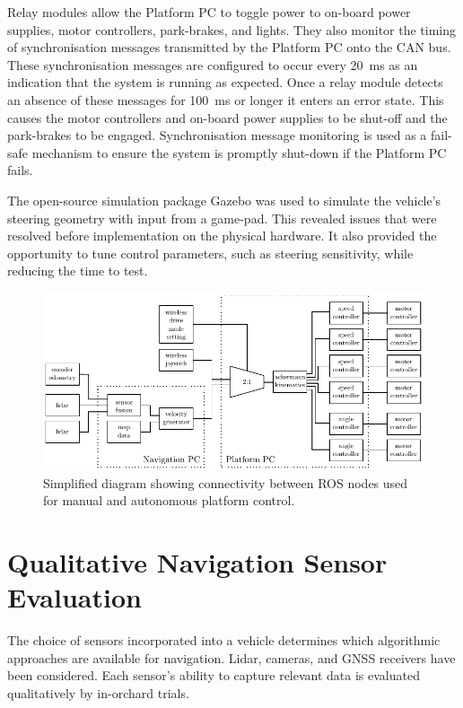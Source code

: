 \documentclass[preprint,authoryear,12pt]{elsarticle}
\begin{document}
        Relay modules allow the Platform PC to toggle power to on-board power supplies, motor controllers, park-brakes, and lights.
        They also monitor the timing of synchronisation messages transmitted by the Platform PC onto the CAN bus.
        These synchronisation messages are configured to occur every \SI{20}{\milli\second} as an indication that the system is running as expected.
        Once a relay module detects an absence of these messages for \SI{100}{\milli\second} or longer it enters an error state.
        This causes the motor controllers and on-board power supplies to be shut-off and the park-brakes to be engaged.
        Synchronisation message monitoring is used as a fail-safe mechanism to ensure the system is promptly shut-down if the Platform PC fails.

        The open-source simulation package Gazebo was used to simulate the vehicle's steering geometry with input from a game-pad.
        This revealed issues that were resolved before implementation on the physical hardware.
        It also provided the opportunity to tune control parameters, such as steering sensitivity, while reducing the time to test.

        \begin{figure}[htb]
            \centering
            \includegraphics[width=\linewidth]{images/software_v2.pdf}
            \caption{Simplified diagram showing connectivity between ROS nodes used for manual and autonomous platform control.}
            \label{fig:system_diagram_software}
        \end{figure}


\section{Qualitative Navigation Sensor Evaluation}
\label{sect:sensors}
    The choice of sensors incorporated into a vehicle determines which algorithmic approaches are available for navigation.
    Lidar, cameras, and GNSS receivers have been considered.
    Each sensor's ability to capture relevant data is evaluated qualitatively by in-orchard trials.
\end{document}
